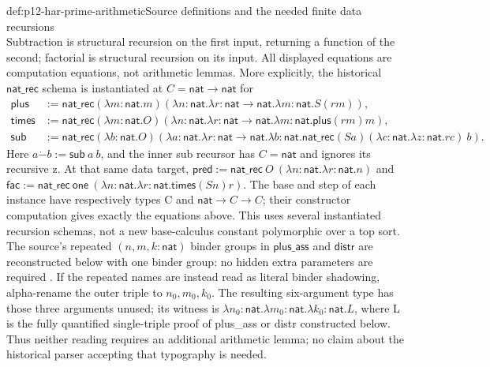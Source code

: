 \begin{hbdefinition}{def:p12-har-prime-arithmetic}{Source definitions and the needed finite data recursions}
\[\]
Subtraction is structural recursion on the first input, returning a
function of the second; factorial is structural recursion on its input.
All displayed equations are computation equations, not arithmetic
lemmas. More explicitly, the historical \(\mathsf{nat\_rec}\) schema
is instantiated at \(C=\mathsf{nat}\to\mathsf{nat}\) for
\[
\begin{aligned}
 \mathsf{plus}&:=\mathsf{nat\_rec}
  (\lambda m:\mathsf{nat}.m)
  (\lambda n:\mathsf{nat}.\lambda r:\mathsf{nat}\to\mathsf{nat}.
                    \lambda m:\mathsf{nat}.S(r m)),\\
 \mathsf{times}&:=\mathsf{nat\_rec}
  (\lambda m:\mathsf{nat}.O)
  (\lambda n:\mathsf{nat}.\lambda r:\mathsf{nat}\to\mathsf{nat}.
                    \lambda m:\mathsf{nat}.\mathsf{plus}(r m)m),\\
 \mathsf{sub}&:=\mathsf{nat\_rec}
  (\lambda b:\mathsf{nat}.O)
  (\lambda a:\mathsf{nat}.\lambda r:\mathsf{nat}\to\mathsf{nat}.
    \lambda b:\mathsf{nat}.
     \mathsf{nat\_rec}(S a)
       (\lambda c:\mathsf{nat}.\lambda z:\mathsf{nat}.r c)\ b).
\end{aligned}
\]
Here \(a\mathbin{\dot{-}}b:=\mathsf{sub}\ a\ b\), and the inner
sub recursor has \(C=\mathsf{nat}\) and ignores its recursive z.
At that same data target,
\(\mathsf{pred}:=\mathsf{nat\_rec}\ O\
(\lambda n:\mathsf{nat}.\lambda r:\mathsf{nat}.n)\)
and \(\mathsf{fac}:=\mathsf{nat\_rec}\ \mathsf{one}\
(\lambda n:\mathsf{nat}.\lambda r:\mathsf{nat}.\mathsf{times}(S n)r)\).
The base and step of each instance have respectively types C and
\(\mathsf{nat}\to C\to C\); their constructor computation gives
exactly the equations above. This uses several instantiated recursion
schemas, not a new base-calculus constant polymorphic over a top sort.
The source's repeated \((n,m,k:\mathsf{nat})\) binder groups in
\(\mathsf{plus\_ass}\) and \(\mathsf{distr}\) are reconstructed below
with one binder group: no hidden extra parameters are required
\cite[pp.~1219--1220 and p.~1215, note~4]{BarendregtGeuvers2001}.
If the repeated names are instead read as literal binder shadowing,
alpha-rename the outer triple to \(n_0,m_0,k_0\). The resulting
six-argument type has those three arguments unused; its witness is
\(\lambda n_0:\mathsf{nat}.\lambda m_0:\mathsf{nat}.
\lambda k_0:\mathsf{nat}.L\), where L is the fully quantified
single-triple proof of plus_ass or distr constructed below. Thus neither
reading requires an additional arithmetic lemma; no claim about the
historical parser accepting that typography is needed.
\end{hbdefinition}

